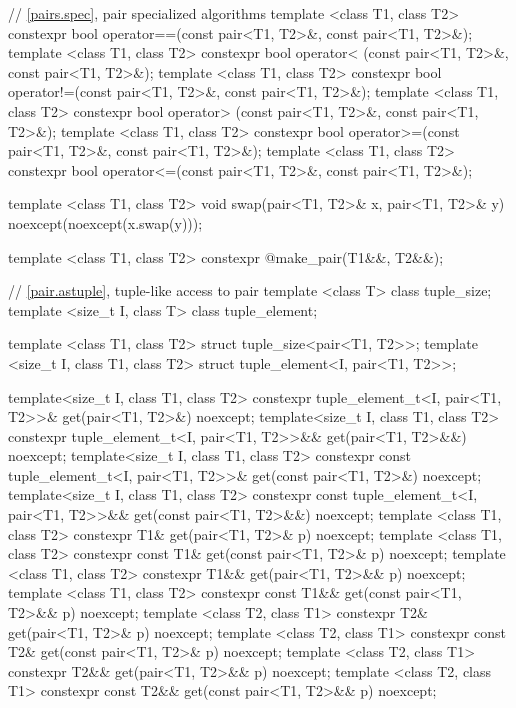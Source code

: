 \begin{codeblock}
{  // \ref{pairs.spec}, pair specialized algorithms
  template <class T1, class T2>
    constexpr bool operator==(const pair<T1, T2>&, const pair<T1, T2>&);
  template <class T1, class T2>
    constexpr bool operator< (const pair<T1, T2>&, const pair<T1, T2>&);
  template <class T1, class T2>
    constexpr bool operator!=(const pair<T1, T2>&, const pair<T1, T2>&);
  template <class T1, class T2>
    constexpr bool operator> (const pair<T1, T2>&, const pair<T1, T2>&);
  template <class T1, class T2>
    constexpr bool operator>=(const pair<T1, T2>&, const pair<T1, T2>&);
  template <class T1, class T2>
    constexpr bool operator<=(const pair<T1, T2>&, const pair<T1, T2>&);

  template <class T1, class T2>
    void swap(pair<T1, T2>& x, pair<T1, T2>& y) noexcept(noexcept(x.swap(y)));

  template <class T1, class T2>
    constexpr @\seebelow@ make_pair(T1&&, T2&&);

  // \ref{pair.astuple}, tuple-like access to pair
  template <class T> class tuple_size;
  template <size_t I, class T> class tuple_element;

  template <class T1, class T2> struct tuple_size<pair<T1, T2>>;
  template <size_t I, class T1, class T2> struct tuple_element<I, pair<T1, T2>>;

  template<size_t I, class T1, class T2>
    constexpr tuple_element_t<I, pair<T1, T2>>& get(pair<T1, T2>&) noexcept;
  template<size_t I, class T1, class T2>
    constexpr tuple_element_t<I, pair<T1, T2>>&& get(pair<T1, T2>&&) noexcept;
  template<size_t I, class T1, class T2>
    constexpr const tuple_element_t<I, pair<T1, T2>>& get(const pair<T1, T2>&) noexcept;
  template<size_t I, class T1, class T2>
    constexpr const tuple_element_t<I, pair<T1, T2>>&& get(const pair<T1, T2>&&) noexcept;
  template <class T1, class T2>
    constexpr T1& get(pair<T1, T2>& p) noexcept;
  template <class T1, class T2>
    constexpr const T1& get(const pair<T1, T2>& p) noexcept;
  template <class T1, class T2>
    constexpr T1&& get(pair<T1, T2>&& p) noexcept;
  template <class T1, class T2>
    constexpr const T1&& get(const pair<T1, T2>&& p) noexcept;
  template <class T2, class T1>
    constexpr T2& get(pair<T1, T2>& p) noexcept;
  template <class T2, class T1>
    constexpr const T2& get(const pair<T1, T2>& p) noexcept;
  template <class T2, class T1>
    constexpr T2&& get(pair<T1, T2>&& p) noexcept;
  template <class T2, class T1>
    constexpr const T2&& get(const pair<T1, T2>&& p) noexcept;

}
\end{codeblock}

